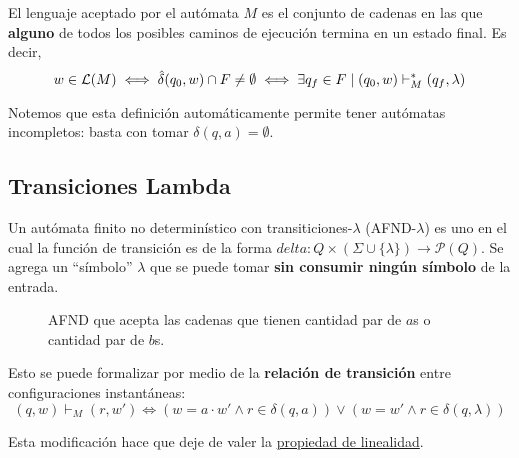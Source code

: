 El lenguaje aceptado por el autómata $M$ es el conjunto de cadenas en las que \textbf{alguno} de todos los posibles caminos de ejecución termina en un estado final. Es decir,
$$
    w \in \mathcal{L}(M) \iff \hat \delta(q_0, w) \cap F \neq \emptyset \iff \exists q_f \in F \mid (q_0, w) \vdash_M^* (q_f, \lambda)
$$

Notemos que esta definición automáticamente permite tener autómatas incompletos: basta con tomar $\delta(q, a) = \emptyset$.

\subsection{Transiciones Lambda}

Un autómata finito no determinístico con transiticiones-$\lambda$ (AFND-$\lambda$) es uno en el cual la función de transición es de la forma $delta : Q \times (\Sigma \cup \{\lambda\}) \to \mathcal P (Q)$. Se agrega un ``símbolo'' $\lambda$ que se puede tomar \textbf{sin consumir ningún símbolo} de la entrada.

\begin{figure}[H]
    \centering
    \caption*{AFND que acepta las cadenas que tienen cantidad par de $a$s o cantidad par de $b$s.}
\end{figure}

Esto se puede formalizar por medio de la \textbf{relación de transición} entre configuraciones instantáneas:
$$
    (q, w) \vdash_M (r, w') \iff (w = a \cdot w' \land r \in \delta(q, a)) \lor (w = w' \land r \in \delta(q, \lambda))
$$

Esta modificación hace que deje de valer la \hyperref[subsubsec-propiedades-rel-transicion]{propiedad de linealidad}.


